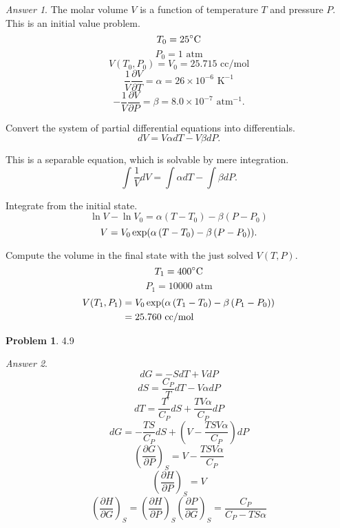 \documentclass[a4paper, 12pt]{article}
\newcommand{\Left}{\mathopen{}\mathclose\bgroup\left}
\newcommand{\Right}{\aftergroup\egroup\right}
\theoremstyle{definition}
\newtheorem{problem}{Problem}[section]
\theoremstyle{remark}
\newtheorem*{answer}{Answer}
\begin{document}
\begin{answer}
    The molar volume $V$ is a function of temperature $T$ and pressure $P$.
    This is an initial value problem.
    \[ T_0 = 25^\circ\text C \]
    \[ P_0 = 1\text{ atm} \]
    \[ V(T_0, P_0) = V_0 = 25.715\text{ cc/mol} \]
    \[ \frac1V \frac{\partial V}{\partial T} = \alpha = 26 \times 10^{-6}\text{ K}^{-1} \]
    \[ -\frac1V \frac{\partial V}{\partial P} = \beta = 8.0 \times 10^{-7}\text{ atm}^{-1}.\]

    Convert the system of partial differential equations into differentials.
    \[ dV = V \alpha dT - V \beta dP.\]

    This is a separable equation, which is solvable by mere integration.
    \[ \int \frac1V dV = \int \alpha dT - \int \beta dP.\]

    Integrate from the initial state.
    \[ \ln V - \ln V_0 = \alpha \left( T - T_0 \right) - \beta \left( P - P_0 \right) \]
    \[ V = V_0 \exp \Left( \alpha \left( T - T_0 \right) - \beta \left( P - P_0 \right) \Right).\]

    Compute the volume in the final state with the just solved $V(T, P)$.
    \[ T_1 = 400^\circ\text C \]
    \[ P_1 = 10000\text{ atm} \]
    \begin{align*}
        V(T_1, P_1)
        &= V_0 \exp \Left( \alpha \left( T_1 - T_0 \right) - \beta \left( P_1 - P_0 \right) \Right) \\
        &= 25.760 \text{ cc/mol}
    \end{align*}
\end{answer}

\begin{problem}
    4.9
\end{problem}

\begin{answer}
    \[ dG = -SdT + VdP \]
    \[ dS = \frac{C_P}{T} dT - V \alpha dP \]
    \[ dT = \frac{T}{C_P} dS + \frac{TV\alpha}{C_P} dP \]
    \[ dG = -\frac{TS}{C_P} dS + \left( V - \frac{TSV\alpha}{C_P} \right) dP \]
    \[ \left( \frac{\partial G}{\partial P} \right)_S = V - \frac{TSV\alpha}{C_P} \]
    \[ \left( \frac{\partial H}{\partial P} \right)_S = V \]
    \[
        \left( \frac{\partial H}{\partial G} \right)_S
        = \left( \frac{\partial H}{\partial P} \right)_S \left( \frac{\partial P}{\partial G} \right)_S
        = \frac{C_P}{C_P - TS\alpha}
    \]
\end{answer}
\end{document}

